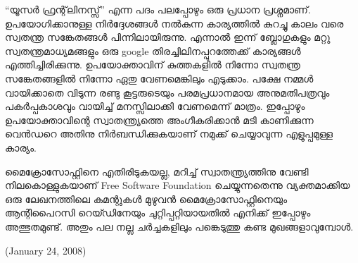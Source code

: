 “യൂസര്‍ ഫ്രന്റ്‌ലിനസ്സ്” എന്ന പദം പലപ്പോഴും ഒരു പ്രധാന പ്രശ്നമാണ്. ഉപയോഗിക്കാനുള്ള നിര്‍‌ദ്ദേശങ്ങള്‍ നല്‍കുന്ന കാര്യത്തില്‍ കുറച്ചു കാലം വരെ സ്വതന്ത്ര സങ്കേതങ്ങള്‍ പിന്നിലായിരുന്നു. എന്നാല്‍ ഇന്ന് ബ്ലോഗുകളും മറ്റു സ്വതന്ത്രമാധ്യമങ്ങളും ഒരു google തിരച്ചിലിനപ്പുറത്തേക്ക് കാര്യങ്ങള്‍ എത്തിച്ചിരിക്കുന്നു. ഉപയോക്താവിന് കുത്തകളില്‍ നിന്നോ സ്വതന്ത്ര സങ്കേതങ്ങളില്‍ നിന്നോ ഏതു വേണമെങ്കിലും എടുക്കാം. പക്ഷേ നമ്മള്‍ വായിക്കാതെ വിടുന്ന രണ്ടു കൂട്ടരുടെയും പരമപ്രധാനമായ അനുമതിപത്രവും പകര്‍പ്പകാശവും വായിച്ച് മനസ്സിലാക്കി വേണമെന്ന് മാത്രം. ഇപ്പോഴും ഉപയോക്താവിന്റെ സ്വാതന്ത്ര്യത്തെ അംഗീകരിക്കാന്‍ മടി കാണിക്കുന്ന വെന്‍ഡറെ അതിനു നിര്‍ബന്ധിക്കുകയാണ് നമുക്ക് ചെയ്യാവുന്ന എളുപ്പമുള്ള കാര്യം.

മൈക്രോസോഫ്റ്റിനെ എതിരിടുകയല്ല, മറിച്ച് സ്വാതന്ത്ര്യത്തിനു വേണ്ടി നിലകൊള്ളുകയാണ് Free Software Foundation ചെയ്യുന്നതെന്നു വ്യക്തമാക്കിയ ഒരു ലേഖനത്തിലെ കമന്റുകള്‍ മുഴുവന്‍ മൈക്രോസോഫ്റ്റിനെയും ആന്റിപൈറസി റെയ്ഡിനേയും ചുറ്റിപ്പറ്റിയായതില്‍ എനിക്ക് ഇപ്പോഴും അത്ഭുതമുണ്ട്. അതും പല നല്ല ചര്‍ച്ചകളിലും പങ്കെടുത്തു കണ്ട മുഖങ്ങളാവുമ്പോള്‍.

(January 24, 2008)
\newpage
